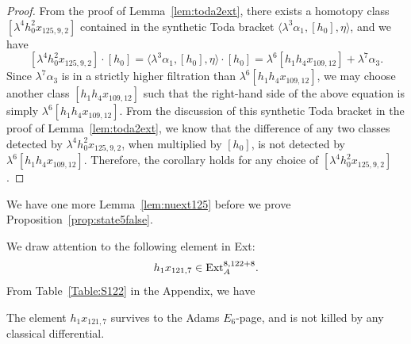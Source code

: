 \documentclass{amsart}
\numberwithin{equation}{section}
\begin{document}
\begin{proof}
    From the proof of Lemma~\ref{lem:toda2ext}, there exists a homotopy class $[\lambda^4 h_0^2x_{125,9,2}]$ contained in the synthetic Toda bracket $ \langle \lambda^3 \alpha_1, [h_0], \eta \rangle$, and we have
    $$[\lambda^4 h_0^2x_{125,9,2}] \cdot [h_0] = \langle \lambda^3 \alpha_1, [h_0], \eta \rangle \cdot [h_0] = \lambda^6 [h_1h_4x_{109,12}] + \lambda^7 \alpha_3.$$
    Since $\lambda^7 \alpha_3$ is in a strictly higher filtration than $\lambda^6 [h_1h_4x_{109,12}]$, we may choose another class $[h_1h_4x_{109,12}]$ such that the right-hand side of the above equation is simply $\lambda^6 [h_1h_4x_{109,12}]$. From the discussion of this synthetic Toda bracket in the proof of Lemma~\ref{lem:toda2ext}, we know that the difference of any two classes detected by $\lambda^4 h_0^2x_{125,9,2}$, when multiplied by $[h_0]$, is not detected by $\lambda^6 [h_1h_4x_{109,12}]$. Therefore, the corollary holds for any choice of $[\lambda^4 h_0^2x_{125,9,2}]$.
\end{proof}
















We have one more Lemma~\ref{lem:nuext125} before we prove Proposition~\ref{prop:state5false}.

We draw attention to the following element in Ext:
$$h_1x_{121,7} \in \mathrm{Ext}_A^{8,122+8}.$$
From Table~\ref{Table:S122} in the Appendix, we have
\begin{fact} \label{fact:h1x1217}
    The element $h_1x_{121,7}$ survives to the Adams $E_6$-page, and is not killed by any classical differential.
\end{fact}
\end{document}
